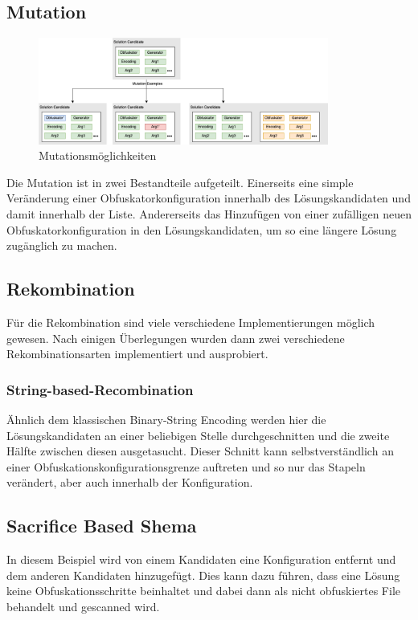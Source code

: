 \subsection{Mutation}
\begin{figure}[h]
    \centering
    \includegraphics[width=0.85\textwidth]{gfx/Abbildungen/Mutations.png}
    \caption{Mutationsmöglichkeiten}
    \label{fig:mutations}
\end{figure}
Die Mutation ist in zwei Bestandteile aufgeteilt. Einerseits eine simple Veränderung einer Obfuskatorkonfiguration innerhalb des Lösungskandidaten und damit innerhalb der Liste. Andererseits das Hinzufügen von einer zufälligen neuen Obfuskatorkonfiguration in den Lösungskandidaten, um so eine längere Lösung zugänglich zu machen.


\subsection{Rekombination}
Für die Rekombination sind viele verschiedene Implementierungen möglich gewesen. Nach einigen Überlegungen wurden dann zwei verschiedene Rekombinationsarten implementiert und ausprobiert.
\subsubsection{String-based-Recombination}
Ähnlich dem klassischen Binary-String Encoding werden hier die Lösungskandidaten an einer beliebigen Stelle durchgeschnitten und die zweite Hälfte zwischen diesen ausgetasucht. Dieser Schnitt kann selbstverständlich an einer Obfuskationskonfigurationsgrenze auftreten und so nur das Stapeln verändert, aber auch innerhalb der Konfiguration.
\subsection{Sacrifice Based Shema}
In diesem Beispiel wird von einem Kandidaten eine Konfiguration entfernt und dem anderen Kandidaten hinzugefügt. Dies kann dazu führen, dass eine Lösung keine Obfuskationsschritte beinhaltet und dabei dann als nicht obfuskiertes File behandelt und gescanned wird.

